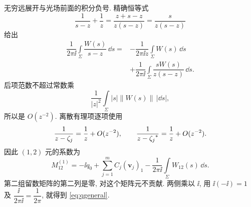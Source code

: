 \par\smallskip\noindent 无穷远展开与光场前面的积分负号.\quad
精确恒等式
\begin{equation*}
\dfrac{1}{s-z}+\dfrac{1}{z}
=\dfrac{z+s-z}{z(s-z)}
=\dfrac{s}{z(s-z)}
\end{equation*}
给出
\begin{equation*}
\begin{aligned}
\dfrac{1}{2\pi\ii}\int\limits_\Sigma
\dfrac{W(s)}{s-z}\,\dd s
={}&-\dfrac{1}{2\pi\ii z}\int\limits_\Sigma W(s)\,\dd s\\
&+\dfrac{1}{2\pi\ii}\int\limits_\Sigma
\dfrac{sW(s)}{z(s-z)}\,\dd s.
\end{aligned}
\end{equation*}
后项范数不超过常数乘
\begin{equation*}
\dfrac{1}{|z|^2}\int\limits_\Sigma |s|\|W(s)\|\,|\dd s|,
\end{equation*}
所以是 $O(z^{-2})$.
离散有理项逐项使用
\begin{equation*}
\dfrac{1}{z-\zeta_j}=\dfrac{1}{z}+O(z^{-2}),\qquad
\dfrac{1}{z-{\zeta_j}^{*}}=\dfrac{1}{z}+O(z^{-2}).
\end{equation*}
因此 $(1,2)$ 元的系数为
\begin{equation*}
M^{(1)}_{12}
=-\ii q_0
+\sum\limits_{j=1}^{m}C_j(\mathbf v_j)_1
-\dfrac{1}{2\pi\ii}\int\limits_\Sigma W_{12}(s)\,\dd s.
\end{equation*}
第二组留数矩阵的第二列是零, 对这个矩阵元不贡献.
两侧乘以 $\ii$, 用 $\ii(-\ii)=1$ 及
$\dfrac{\ii}{2\pi\ii}=\dfrac{1}{2\pi}$, 就得到 \eqref{eq:qgeneral}.

